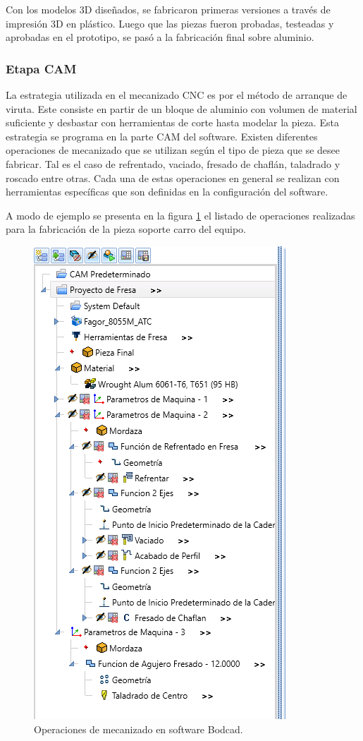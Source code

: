 Con los modelos 3D diseñados, se fabricaron primeras versiones a través de impresión 3D en plástico. 
Luego que las piezas fueron probadas, testeadas y aprobadas en el prototipo, se pasó a la fabricación final sobre aluminio.

\subsubsection{Etapa CAM}

La estrategia utilizada en el mecanizado CNC es por el método de arranque de viruta. Este consiste en partir de un bloque de aluminio con volumen de material suficiente y desbastar con herramientas de corte hasta modelar la pieza. Esta estrategia se programa en la parte CAM del software. Existen diferentes operaciones de mecanizado que se utilizan según el tipo de pieza que se desee fabricar. Tal es el caso de refrentado, vaciado, fresado de chaflán, taladrado y roscado entre otras. Cada una de estas operaciones  en general se realizan con herramientas específicas que son definidas en la configuración del software.

A modo de ejemplo se presenta en la figura \ref{fig:estrategia} el listado de operaciones realizadas para la fabricación de la pieza soporte carro del equipo.

\begin{figure}[h]
	\centering
	\includegraphics[width=.6\textwidth]{./Figures/3d_estrategia.png}
	\caption{Operaciones de mecanizado en software Bodcad.}
	\label{fig:estrategia}
\end{figure}

